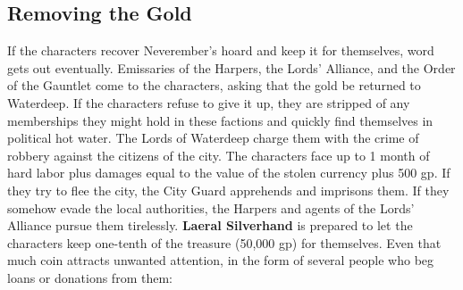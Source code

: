\documentclass[10pt,a4paper,twoside,twocolumn,openany,nodeprecatedcode]{dndbook}
\begin{document}
\subsection{Removing the Gold}
If the characters recover Neverember's hoard and keep it for themselves, word gets out eventually.
Emissaries of the Harpers, the Lords' Alliance, and the Order of the Gauntlet come to the characters, asking that the gold be returned to Waterdeep. If the characters refuse to give it up, they are stripped of any memberships they might hold in these factions and quickly find themselves in political hot water. The Lords of Waterdeep charge them with the crime of robbery against the citizens of the city. The characters face up to 1 month of hard labor plus damages equal to the value of the stolen currency plus 500 gp. If they try to flee the city, the City Guard apprehends and imprisons them. If they somehow evade the local authorities, the Harpers and agents of the Lords' Alliance pursue them tirelessly.
\textbf{Laeral Silverhand} is prepared to let the characters keep one-tenth of the treasure (50,000 gp) for themselves. Even that much coin attracts unwanted attention, in the form of several people who beg loans or donations from them:
\end{document}
